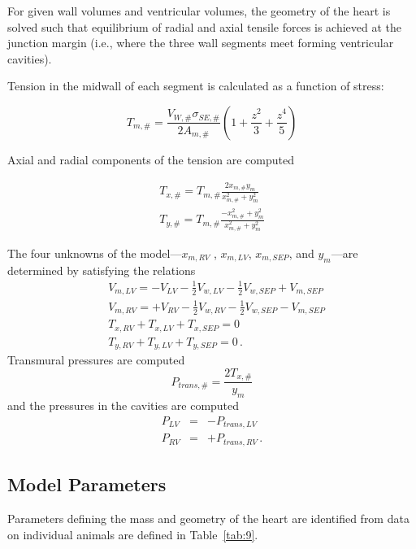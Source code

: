 \documentclass[fleqn,10pt]{physiome}
\begin{document}
For given wall volumes and ventricular volumes, the geometry of the heart is solved such that equilibrium of radial and axial tensile forces is achieved at the junction margin (i.e., where the three wall segments meet forming ventricular cavities).

Tension in the midwall of each segment is calculated as a function of stress: 

\begin{equation}
    T_{m,\#} = \frac {V_{W,\#} \sigma_{SE,\#}}{2A_{m,\#}} 
    \left(1+\frac{z^{2}}{3}+\frac{z^{4}}{5}\right)
\end{equation}

Axial and radial components of the tension are computed 

\begin{eqnarray}
 T_{x,\#} = T_{m,\#} \frac{2x_{m,\#}y_{m}}{x_{m,\#}^{2}+y_{m}^{2}} \nonumber \\
 T_{y,\#} = T_{m,\#} \frac{-x_{m,\#}^{2}+y_{m}^{2}}{x_{m,\#}^{2}+y_{m}^{2}}
\end{eqnarray}
   
The four unknowns of the model---$x_{m,RV}$ , $x_{m,LV}$, $x_{m,SEP}$, and $y_{m}$---are determined by satisfying the relations
\begin{eqnarray}
  & V_{m,LV} = -V_{LV} - \frac{1}{2} V_{w,LV} - \frac{1}{2} V_{w,SEP} + V_{m,SEP} \nonumber \\
  & V_{m,RV} = +V_{RV} - \frac{1}{2} V_{w,RV} - \frac{1}{2} V_{w,SEP} - V_{m,SEP} \nonumber \\
  & T_{x,RV} + T_{x,LV} + T_{x,SEP} = 0 \nonumber \\
  & T_{y,RV} + T_{y,LV} + T_{y,SEP} = 0 \nonumber \, .
\end{eqnarray}
Transmural pressures are computed
\begin{equation}
    P_{trans,\#} = \frac{2T_{x,\#}}{y_{m}}
\end{equation}
and the pressures in the cavities are computed
\begin{eqnarray}
P_{LV} &=& - P_{trans,LV} \nonumber \\
P_{RV} &=& + P_{trans,RV} \nonumber \, .
\end{eqnarray}
\subsection{Model Parameters}

Parameters defining the mass and geometry of the heart are identified from data on individual animals are defined in Table~\ref{tab:9}.
\end{document}
